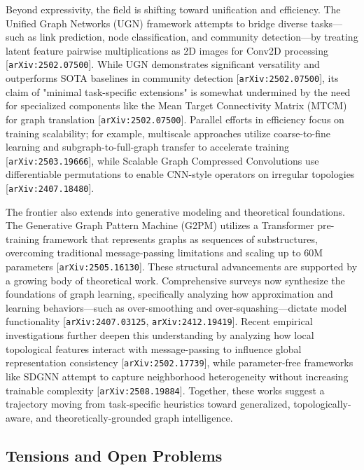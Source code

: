 \documentclass[11pt]{article}
\begin{document}
Beyond expressivity, the field is shifting toward unification and efficiency. The Unified Graph Networks (UGN) framework attempts to bridge diverse tasks—such as link prediction, node classification, and community detection—by treating latent feature pairwise multiplications as 2D images for Conv2D processing [\texttt{arXiv:2502.07500}]. While UGN demonstrates significant versatility and outperforms SOTA baselines in community detection [\texttt{arXiv:2502.07500}], its claim of "minimal task-specific extensions" is somewhat undermined by the need for specialized components like the Mean Target Connectivity Matrix (MTCM) for graph translation [\texttt{arXiv:2502.07500}]. Parallel efforts in efficiency focus on training scalability; for example, multiscale approaches utilize coarse-to-fine learning and subgraph-to-full-graph transfer to accelerate training [\texttt{arXiv:2503.19666}], while Scalable Graph Compressed Convolutions use differentiable permutations to enable CNN-style operators on irregular topologies [\texttt{arXiv:2407.18480}].

The frontier also extends into generative modeling and theoretical foundations. The Generative Graph Pattern Machine (G2PM) utilizes a Transformer pre-training framework that represents graphs as sequences of substructures, overcoming traditional message-passing limitations and scaling up to 60M parameters [\texttt{arXiv:2505.16130}]. These structural advancements are supported by a growing body of theoretical work. Comprehensive surveys now synthesize the foundations of graph learning, specifically analyzing how approximation and learning behaviors—such as over-smoothing and over-squashing—dictate model functionality [\texttt{arXiv:2407.03125}, \texttt{arXiv:2412.19419}]. Recent empirical investigations further deepen this understanding by analyzing how local topological features interact with message-passing to influence global representation consistency [\texttt{arXiv:2502.17739}], while parameter-free frameworks like SDGNN attempt to capture neighborhood heterogeneity without increasing trainable complexity [\texttt{arXiv:2508.19884}]. Together, these works suggest a trajectory moving from task-specific heuristics toward generalized, topologically-aware, and theoretically-grounded graph intelligence.

\subsection{Tensions and Open Problems}
\end{document}

